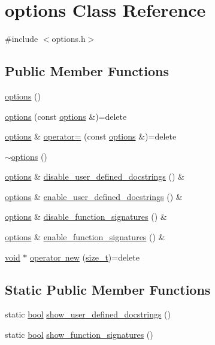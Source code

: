 \hypertarget{classoptions}{}\section{options Class Reference}
\label{classoptions}


{\ttfamily \#include $<$options.\+h$>$}

\subsection*{Public Member Functions}
\begin{DoxyCompactItemize}
\item 
\mbox{\hyperlink{classoptions_a41a256b4ba3b2d68a2d72b9245aa0c4d}{options}} ()
\item 
\mbox{\hyperlink{classoptions_a13cdbe12daae1dfd7e161a5527de0742}{options}} (const \mbox{\hyperlink{classoptions}{options}} \&)=delete
\item 
\mbox{\hyperlink{classoptions}{options}} \& \mbox{\hyperlink{classoptions_a42215bbd44ad5ca124d29a21649c1bb4}{operator=}} (const \mbox{\hyperlink{classoptions}{options}} \&)=delete
\item 
\mbox{\hyperlink{classoptions_aeb360f60766b8cff26c8ec46c1bc78ca}{$\sim$options}} ()
\item 
\mbox{\hyperlink{classoptions}{options}} \& \mbox{\hyperlink{classoptions_a72b0a4f748e3080e73dbe05e70dd5307}{disable\+\_\+user\+\_\+defined\+\_\+docstrings}} () \&
\item 
\mbox{\hyperlink{classoptions}{options}} \& \mbox{\hyperlink{classoptions_a44ceafcf829da82a6ecddc41050d3dc9}{enable\+\_\+user\+\_\+defined\+\_\+docstrings}} () \&
\item 
\mbox{\hyperlink{classoptions}{options}} \& \mbox{\hyperlink{classoptions_af6dce379743c47f9827405ef1039efe3}{disable\+\_\+function\+\_\+signatures}} () \&
\item 
\mbox{\hyperlink{classoptions}{options}} \& \mbox{\hyperlink{classoptions_a468cb78d763430aef7d1fe5c4f7a2c22}{enable\+\_\+function\+\_\+signatures}} () \&
\item 
\mbox{\hyperlink{_s_d_l__opengles2__gl2ext_8h_ae5d8fa23ad07c48bb609509eae494c95}{void}} $\ast$ \mbox{\hyperlink{classoptions_aaa989a3a54bb17948c753569cb60b4cc}{operator new}} (\mbox{\hyperlink{detail_2common_8h_a801d6a451a01953ef8cbae6feb6a3638}{size\+\_\+t}})=delete
\end{DoxyCompactItemize}
\subsection*{Static Public Member Functions}
\begin{DoxyCompactItemize}
\item 
static \mbox{\hyperlink{asdl_8h_af6a258d8f3ee5206d682d799316314b1}{bool}} \mbox{\hyperlink{classoptions_af812a48c76ad251894b1483c131c8fe8}{show\+\_\+user\+\_\+defined\+\_\+docstrings}} ()
\item 
static \mbox{\hyperlink{asdl_8h_af6a258d8f3ee5206d682d799316314b1}{bool}} \mbox{\hyperlink{classoptions_af2fa374b06da8ecfaa06beaf3bfac1a9}{show\+\_\+function\+\_\+signatures}} ()
\end{DoxyCompactItemize}


